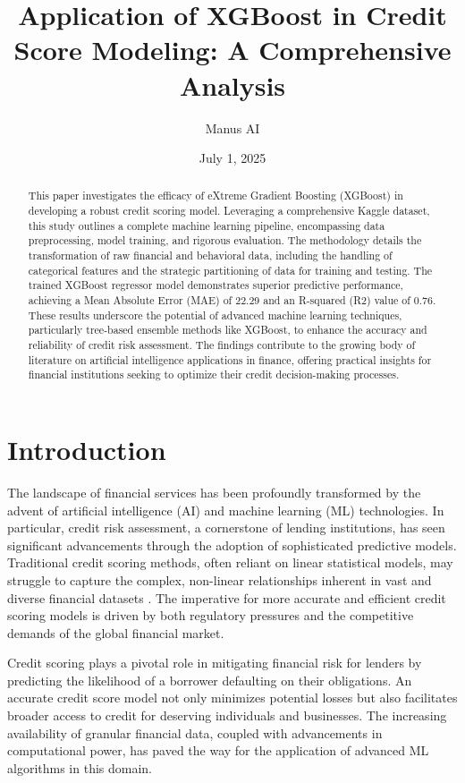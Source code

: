 \documentclass{article}
\title{Application of XGBoost in Credit Score Modeling: A Comprehensive Analysis}
\author{Manus AI}
\date{July 1, 2025}
\begin{document}
\maketitle

\begin{abstract}
This paper investigates the efficacy of eXtreme Gradient Boosting (XGBoost) in developing a robust credit scoring model. Leveraging a comprehensive Kaggle dataset, this study outlines a complete machine learning pipeline, encompassing data preprocessing, model training, and rigorous evaluation. The methodology details the transformation of raw financial and behavioral data, including the handling of categorical features and the strategic partitioning of data for training and testing. The trained XGBoost regressor model demonstrates superior predictive performance, achieving a Mean Absolute Error (MAE) of 22.29 and an R-squared (R2) value of 0.76. These results underscore the potential of advanced machine learning techniques, particularly tree-based ensemble methods like XGBoost, to enhance the accuracy and reliability of credit risk assessment. The findings contribute to the growing body of literature on artificial intelligence applications in finance, offering practical insights for financial institutions seeking to optimize their credit decision-making processes.
\end{abstract}

\section{Introduction}

The landscape of financial services has been profoundly transformed by the advent of artificial intelligence (AI) and machine learning (ML) technologies. In particular, credit risk assessment, a cornerstone of lending institutions, has seen significant advancements through the adoption of sophisticated predictive models. Traditional credit scoring methods, often reliant on linear statistical models, may struggle to capture the complex, non-linear relationships inherent in vast and diverse financial datasets \cite{thomas2002credit}. The imperative for more accurate and efficient credit scoring models is driven by both regulatory pressures and the competitive demands of the global financial market.

Credit scoring plays a pivotal role in mitigating financial risk for lenders by predicting the likelihood of a borrower defaulting on their obligations. An accurate credit score model not only minimizes potential losses but also facilitates broader access to credit for deserving individuals and businesses. The increasing availability of granular financial data, coupled with advancements in computational power, has paved the way for the application of advanced ML algorithms in this domain.
\end{document}
